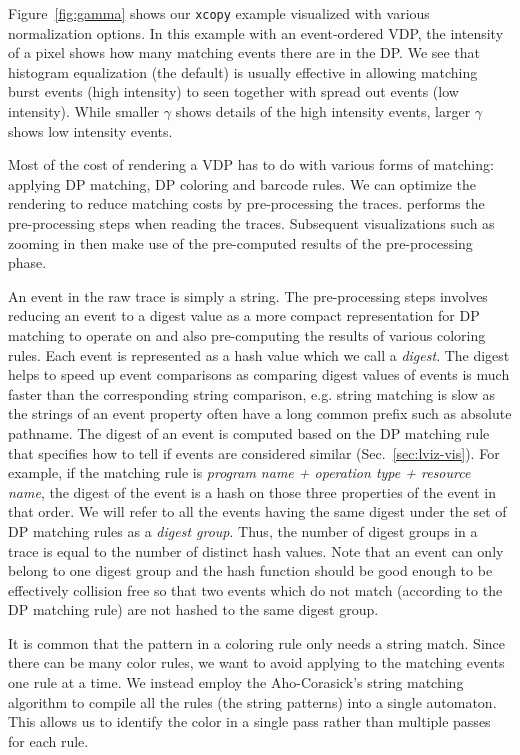 Figure~\ref{fig:gamma} shows our {\tt xcopy} example visualized
with various normalization options.
In this example with an event-ordered VDP,
the intensity of a pixel shows how many matching events there are in the DP.
We see that histogram equalization (the default) is usually effective
in allowing matching burst events (high intensity) to seen together
with spread out events (low intensity).
While smaller $\gamma$ shows details of the high intensity events,
larger $\gamma$ shows low intensity events.

Most of the cost of rendering a VDP has to do with various forms of
matching: applying DP matching, DP coloring and barcode rules.
We can optimize the rendering to reduce matching costs by pre-processing
the traces.  performs the pre-processing steps when reading the
traces. Subsequent visualizations such as zooming in then make use of
the pre-computed results of the pre-processing phase.

An event in the raw trace is simply a string.
The pre-processing steps involves reducing an event to
a digest value as a more compact representation for DP matching
to operate on and also pre-computing the
results of various coloring rules.
Each event is represented as a hash value which we call a {\em digest}.
The digest helps to speed up event comparisons
as comparing digest values of events is much faster than
the corresponding string comparison, e.g. string matching is slow
as the strings of an event property often have a long common prefix such
as absolute pathname.
The digest of an event is computed based on the DP matching rule that specifies
how to tell if events are considered similar (Sec.~\ref{sec:lviz-vis}).
For example, if the matching rule is 
{\em program name + operation type + resource name}, the digest
of the event is a hash on those three properties of the event in that order.
We will refer to all the events having the same digest under
the set of DP matching rules as a {\em digest group}.
Thus, the number of digest groups in a trace is equal to the number of distinct hash values.
Note that an event can only belong to one digest group and the hash function
should be good enough to be effectively collision free so that 
two events which do not match (according to the DP matching rule) are
not hashed to the same digest group.

It is common that the pattern in a coloring rule only needs a string
match.
Since there can be many color rules, we want to avoid applying
to the matching events one rule at a time.
We instead employ the Aho-Corasick's string matching algorithm \cite{aho1975efficient}
to compile all the rules (the string patterns) into a single automaton.
This allows us to identify the color in a single pass
rather than multiple passes for each rule.

